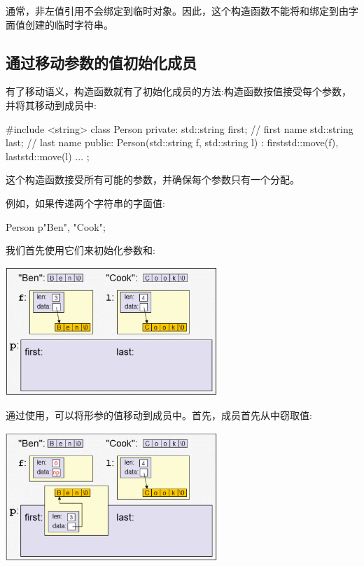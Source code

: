 通常，非左值引用不会绑定到临时对象。因此，这个构造函数不能将和绑定到由字面值创建的临时字符串。

\subsection{通过移动参数的值初始化成员}

有了移动语义，构造函数就有了初始化成员的方法:构造函数按值接受每个参数，并将其移动到成员中:

\begin{cppcode}
#include <string>
class Person {
private:
	std::string first; // first name
	std::string last; // last name
public:
	Person(std::string f, std::string l)
	: first{std::move(f)}, last{std::move(l)} {
	}
	...
};
\end{cppcode}

这个构造函数接受所有可能的参数，并确保每个参数只有一个分配。

例如，如果传递两个字符串的字面值:

\begin{cppcode}
Person p{"Ben", "Cook"};
\end{cppcode}

我们首先使用它们来初始化参数和:

\begin{center}
	\includegraphics[width=0.6\textwidth]{part1/ch4/images/4}
\end{center}

通过使用，可以将形参的值移动到成员中。首先，成员首先从中窃取值:

\begin{center}
	\includegraphics[width=0.6\textwidth]{part1/ch4/images/5}
\end{center}

